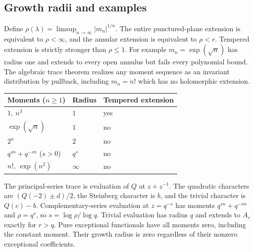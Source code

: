\subsection{Growth radii and examples}
Define $\rho(\lambda)=\limsup_{n\to\infty}|m_n|^{1/n}$. The entire punctured-plane extension is equivalent to $\rho<\infty$, and the annular extension is equivalent to $\rho<r$. Tempered extension is strictly stronger than $\rho\le1$. For example $m_n=\exp(\sqrt n)$ has radius one and extends to every open annulus but fails every polynomial bound. The algebraic trace theorem realizes any moment sequence as an invariant distribution by pullback, including $m_n=n!$ which has no holomorphic extension.
\begin{center}\small
\begin{tabular}{lll}
\hline
Moments ($n\ge1$)& Radius & Tempered extension\\\hline
$1,\ n^3$ & $1$ & yes\\
$\exp(\sqrt n)$ & $1$ & no\\
$2^n$ & $2$ & no\\
$q^{sn}+q^{-sn}$ ($s>0$) & $q^s$ & no\\
$n!,\ \exp(n^2)$ & $\infty$ & no\\\hline
\end{tabular}
\end{center}
\begin{center}
\end{center}
The principal-series trace is evaluation of $Q$ at $z+z^{-1}$. The quadratic characters are $(Q(-2)\pm d)/2$, the Steinberg character is $b$, and the trivial character is $Q(c)-b$. Complementary-series evaluation at $z=q^{-s}$ has moments $q^{sn}+q^{-sn}$ and $\rho=q^s$, so $s=\log\rho/\log q$. Trivial evaluation has radius $q$ and extends to $A_r$ exactly for $r>q$. Pure exceptional functionals have all moments zero, including the constant moment. Their growth radius is zero regardless of their nonzero exceptional coefficients.

